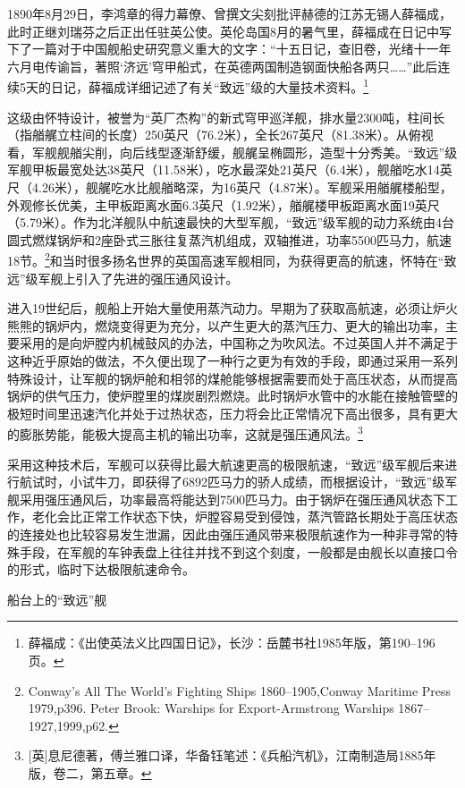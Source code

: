 \documentclass[12pt,UTF8]{ctexbook}
\begin{document}
1890年8月29日，李鸿章的得力幕僚、曾撰文尖刻批评赫德的江苏无锡人薛福成，此时正继刘瑞芬之后正出任驻英公使。英伦岛国8月的暑气里，薛福成在日记中写下了一篇对于中国舰船史研究意义重大的文字：“十五日记，查旧卷，光绪十一年六月电传谕旨，著照‘济远’穹甲船式，在英德两国制造钢面快船各两只……”此后连续5天的日记，薛福成详细记述了有关“致远”级的大量技术资料。\footnote{薛福成：《出使英法义比四国日记》，长沙：岳麓书社1985年版，第190--196页。}

这级由怀特设计，被誉为“英厂杰构”的新式穹甲巡洋舰，排水量2300吨，柱间长（指艏艉立柱间的长度）250英尺（76.2米），全长267英尺（81.38米）。从俯视看，军舰舰艏尖削，向后线型逐渐舒缓，舰艉呈椭圆形，造型十分秀美。“致远”级军舰甲板最宽处达38英尺（11.58米），吃水最深处21英尺（6.4米），舰艏吃水14英尺（4.26米），舰艉吃水比舰艏略深，为16英尺（4.87米）。军舰采用艏艉楼船型，外观修长优美，主甲板距离水面6.3英尺（1.92米），艏艉楼甲板距离水面19英尺（5.79米）。作为北洋舰队中航速最快的大型军舰，“致远”级军舰的动力系统由4台圆式燃煤锅炉和2座卧式三胀往复蒸汽机组成，双轴推进，功率5500匹马力，航速18节。\footnote{Conway's All The World's Fighting Ships 1860--1905,Conway Maritime Press 1979,p396. Peter Brook: Warships for Export-Armstrong Warships 1867--1927,1999,p62.}和当时很多扬名世界的英国高速军舰相同，为获得更高的航速，怀特在“致远”级军舰上引入了先进的强压通风设计。

进入19世纪后，舰船上开始大量使用蒸汽动力。早期为了获取高航速，必须让炉火熊熊的锅炉内，燃烧变得更为充分，以产生更大的蒸汽压力、更大的输出功率，主要采用的是向炉膛内机械鼓风的办法，中国称之为吹风法。不过英国人并不满足于这种近乎原始的做法，不久便出现了一种行之更为有效的手段，即通过采用一系列特殊设计，让军舰的锅炉舱和相邻的煤舱能够根据需要而处于高压状态，从而提高锅炉的供气压力，使炉膛里的煤炭剧烈燃烧。此时锅炉水管中的水能在接触管壁的极短时间里迅速汽化并处于过热状态，压力将会比正常情况下高出很多，具有更大的膨胀势能，能极大提高主机的输出功率，这就是强压通风法。\footnote{[英]息尼德著，傅兰雅口译，华备钰笔述：《兵船汽机》，江南制造局1885年版，卷二，第五章。}

采用这种技术后，军舰可以获得比最大航速更高的极限航速，“致远”级军舰后来进行航试时，小试牛刀，即获得了6892匹马力的骄人成绩，而根据设计，“致远”级军舰采用强压通风后，功率最高将能达到7500匹马力。由于锅炉在强压通风状态下工作，老化会比正常工作状态下快，炉膛容易受到侵蚀，蒸汽管路长期处于高压状态的连接处也比较容易发生泄漏，因此由强压通风带来极限航速作为一种非寻常的特殊手段，在军舰的车钟表盘上往往并找不到这个刻度，一般都是由舰长以直接口令的形式，临时下达极限航速命令。

船台上的“致远”舰
\end{document}

